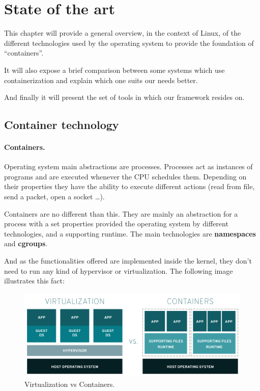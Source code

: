 \clearpage\section{State of the art}
This chapter will provide a general overview, in the context of Linux, of the different technologies used by the operating system to provide the foundation of ``containers''.

It will also expose a brief comparison between some systems which use containerization and explain which one suits our needs better.

And finally it will present the set of tools in which our framework resides on.

\subsection{Container technology}
\paragraph{Containers.} Operating system main abstractions are processes. Processes act as instances of programs and are executed whenever the CPU schedules them. Depending on their properties they have the ability to execute different actions (read from file, send a packet, open a socket \dots).

Containers are no different than this. They are mainly an abstraction for a process with a set properties provided the operating system by different technologies, and a supporting runtime. The main technologies are \textbf{namespaces} and \textbf{cgroups}.

And as the functionalities offered are implemented inside the kernel, they don't need to run any kind of hypervisor or virtualization. The following image illustrates this fact:

\begin{figure}[H]
	\label{fig:Virtualization vs Containers}
	\centering
	\includegraphics[width=\textwidth]{img/02/02-state-virtualization-vs-containers.png}
	\caption[Virtualization vs Containers]{\footnotesize{Virtualization vs Containers.}}
\end{figure}

